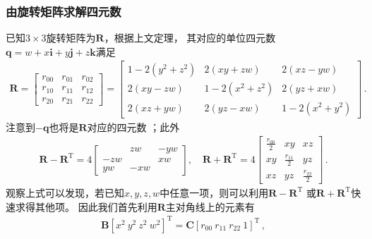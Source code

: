 \subsubsection*{由旋转矩阵求解四元数}
已知$3\times3$旋转矩阵为$\bm R$，根据上文定理，
其对应的单位四元数$\bm q=w+x\mathbf{i}+y\mathbf{j}+z\mathbf{k}$满足
\begin{align}
    \bm R=\left[\begin{array}{ccc}
            r_{00} & r_{01} & r_{02} \\
            r_{10} & r_{11} & r_{12} \\
            r_{20} & r_{21} & r_{22}
        \end{array}\right]
    =\left[\begin{array}{ccc}
            1-2(y^2+z^2) & 2(xy+zw)     & 2(xz-yw)     \\
            2(xy-zw)     & 1-2(x^2+z^2) & 2(yz+xw)     \\
            2(xz+yw)     & 2(yz-xw)     & 1-2(x^2+y^2)
        \end{array}\right]\, .
\end{align}
注意到$-\bm q$也将是$\bm R$对应的四元数
；此外
\begin{align}\label{eq:02ex.1}
    \bm R-\bm R^\mathrm{T}=4\left[\begin{array}{ccc}
                & zw  & -yw \\
            -zw &     & xw  \\
            yw  & -xw &
        \end{array}\right],\quad
    \bm R+\bm R^\mathrm{T}=4\left[\begin{array}{ccc}
            \displaystyle\frac{r_{00}}{2} & xy                            & xz                            \\
            xy                            & \displaystyle\frac{r_{11}}{2} & yz                            \\
            xz                            & yz                            & \displaystyle\frac{r_{22}}{2}
        \end{array}\right]\, .
\end{align}
观察上式可以发现，若已知$x,y,z,w$中任意一项，则可以利用$\bm R-\bm R^\mathrm{T}$
或$\bm R+\bm R^\mathrm{T}$快速求得其他项。
因此我们首先利用$\bm R$主对角线上的元素有
\begin{align}
    \bm B[x^2\ y^2\ z^2\ w^2]^\mathrm{T}=\bm C[r_{00}\ r_{11}\ r_{22}\ 1]^\mathrm{T}\, ,
\end{align}
